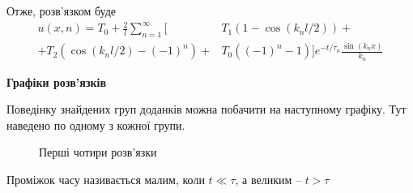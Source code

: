\documentclass[a4paper, 14pt]{extreport}
\begin{document}
Отже, розв'язком буде
\begin{equation}
    \begin{aligned}
        u(x,n) = T_0 + \frac{2}{l}\sum_{n=1}^{\infty}\big[&T_1(1 - \cos(k_n l/2)) +\\
        + T_2(\cos(k_n l/2) - (-1)^n) + &T_0 ((-1)^n - 1)\big] e^{-t/\tau_n} \frac{\sin(k_n x)}{k_n}
    \end{aligned}
\end{equation}

\begin{center}
    \textbf{Графіки розв'язків}
\end{center}

Поведінку знайдених груп доданків можна побачити на наступному графіку. Тут наведено по одному з кожної групи. %
\begin{figure}[h]
    \centering
\caption{Перші чотири розв'язки}
\end{figure}

Проміжок часу називається малим, коли $t \ll \tau$, а великим -- $t > \tau$
\end{document}
